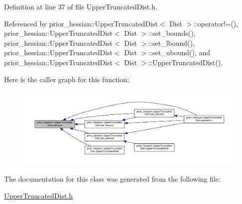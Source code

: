 Definition at line 37 of file Upper\+Truncated\+Dist.\+h.



Referenced by prior\+\_\+hessian\+::\+Upper\+Truncated\+Dist$<$ Dist $>$\+::operator!=(), prior\+\_\+hessian\+::\+Upper\+Truncated\+Dist$<$ Dist $>$\+::set\+\_\+bounds(), prior\+\_\+hessian\+::\+Upper\+Truncated\+Dist$<$ Dist $>$\+::set\+\_\+lbound(), prior\+\_\+hessian\+::\+Upper\+Truncated\+Dist$<$ Dist $>$\+::set\+\_\+ubound(), and prior\+\_\+hessian\+::\+Upper\+Truncated\+Dist$<$ Dist $>$\+::\+Upper\+Truncated\+Dist().



Here is the caller graph for this function\+:\nopagebreak
\begin{figure}[H]
\begin{center}
\leavevmode
\includegraphics[width=350pt]{classprior__hessian_1_1UpperTruncatedDist_a047a08465860a8f2aea2af28760df905_icgraph}
\end{center}
\end{figure}




The documentation for this class was generated from the following file\+:\begin{DoxyCompactItemize}
\item 
\hyperlink{UpperTruncatedDist_8h}{Upper\+Truncated\+Dist.\+h}\end{DoxyCompactItemize}
